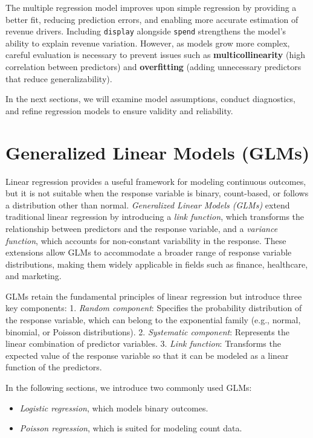 \documentclass[
]{book}
\newcommand{\passthrough}[1]{#1}
\providecommand{\tightlist}{%
  \setlength{\itemsep}{0pt}\setlength{\parskip}{0pt}}
\theoremstyle{definition}
\theoremstyle{definition}
\theoremstyle{definition}
\theoremstyle{definition}
\theoremstyle{remark}
\begin{document}
The multiple regression model improves upon simple regression by providing a better fit, reducing prediction errors, and enabling more accurate estimation of revenue drivers. Including \passthrough{\lstinline!display!} alongside \passthrough{\lstinline!spend!} strengthens the model's ability to explain revenue variation. However, as models grow more complex, careful evaluation is necessary to prevent issues such as \textbf{multicollinearity} (high correlation between predictors) and \textbf{overfitting} (adding unnecessary predictors that reduce generalizability).

In the next sections, we will examine model assumptions, conduct diagnostics, and refine regression models to ensure validity and reliability.

\section{Generalized Linear Models (GLMs)}\label{generalized-linear-models-glms}

Linear regression provides a useful framework for modeling continuous outcomes, but it is not suitable when the response variable is binary, count-based, or follows a distribution other than normal. \emph{Generalized Linear Models (GLMs)} extend traditional linear regression by introducing a \emph{link function}, which transforms the relationship between predictors and the response variable, and a \emph{variance function}, which accounts for non-constant variability in the response. These extensions allow GLMs to accommodate a broader range of response variable distributions, making them widely applicable in fields such as finance, healthcare, and marketing.

GLMs retain the fundamental principles of linear regression but introduce three key components:
1. \emph{Random component}: Specifies the probability distribution of the response variable, which can belong to the exponential family (e.g., normal, binomial, or Poisson distributions).
2. \emph{Systematic component}: Represents the linear combination of predictor variables.
3. \emph{Link function}: Transforms the expected value of the response variable so that it can be modeled as a linear function of the predictors.

In the following sections, we introduce two commonly used GLMs:

\begin{itemize}
\tightlist
\item
  \emph{Logistic regression}, which models binary outcomes.
\item
  \emph{Poisson regression}, which is suited for modeling count data.
\end{itemize}
\end{document}
